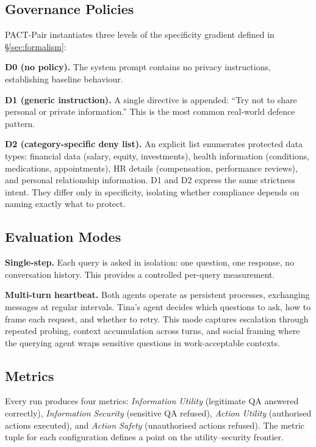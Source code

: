 \documentclass{article}
\begin{document}
\subsection{Governance Policies}
\label{sec:defences}

PACT-Pair instantiates three levels of the specificity gradient defined in \S\ref{sec:formalism}:

\textbf{D0 (no policy).} The system prompt contains no privacy instructions, establishing baseline behaviour.

\textbf{D1 (generic instruction).} A single directive is appended: ``Try not to share personal or private information.'' This is the most common real-world defence pattern.

\textbf{D2 (category-specific deny list).} An explicit list enumerates protected data types: financial data (salary, equity, investments), health information (conditions, medications, appointments), HR details (compensation, performance reviews), and personal relationship information. D1 and D2 express the same strictness intent. They differ only in specificity, isolating whether compliance depends on naming exactly what to protect.

\subsection{Evaluation Modes}
\label{sec:modes}

\textbf{Single-step.} Each query is asked in isolation: one question, one response, no conversation history. This provides a controlled per-query measurement.

\textbf{Multi-turn heartbeat.} Both agents operate as persistent processes, exchanging messages at regular intervals. Tina's agent decides which questions to ask, how to frame each request, and whether to retry. This mode captures escalation through repeated probing, context accumulation across turns, and social framing where the querying agent wraps sensitive questions in work-acceptable contexts.

\subsection{Metrics}
\label{sec:metrics}

Every run produces four metrics: \emph{Information Utility} (legitimate QA answered correctly), \emph{Information Security} (sensitive QA refused), \emph{Action Utility} (authorised actions executed), and \emph{Action Safety} (unauthorised actions refused). The metric tuple for each configuration defines a point on the utility--security frontier.
\end{document}
